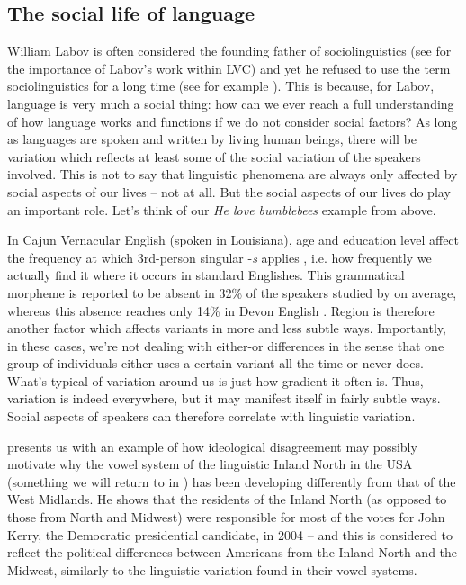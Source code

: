 \subsection{The social life of language}\label{social-life}
William Labov is often considered the founding father of sociolinguistics (see \citealp{Koerner1991} for the importance of Labov's work within LVC) and yet he refused to use the term sociolinguistics for a long time (see for example \citealp{Chambers2017}). This is because, for Labov, language is very much a social thing: how can we ever reach a full understanding of how language works and functions if we do not consider social factors? As long as languages are spoken and written by living human beings, there will be variation which reflects at least some of the social variation of the speakers involved. This is not to say that linguistic phenomena are always only affected by social aspects of our lives -- not at all. But the social aspects of our lives do play an important role. Let's think of our \textit{He love bumblebees} example from above.

In Cajun Vernacular English (spoken in Louisiana), age and education level affect the frequency at which 3rd-person singular -\emph{s} applies \citep[39]{DuboisHorvath2003}, i.e. how frequently we actually find it where it occurs in standard Englishes. This grammatical morpheme is reported to be absent in 32\% of the speakers studied by \citet[42]{DuboisHorvath2003} on average, whereas this absence reaches only 14\% in Devon English \citeyearpar[42]{DuboisHorvath2003}. Region is therefore another factor which affects variants in more and less subtle ways. Importantly, in these cases, we're not dealing with either-or differences in the sense that one group of individuals either uses a certain variant all the time or never does. What's typical of variation around us is just how gradient it often is. Thus, variation is indeed everywhere, but it may manifest itself in fairly subtle ways. Social aspects of speakers can therefore correlate with linguistic variation. 

\citet[212 and 223]{Labov2010} presents us with an example of how ideological disagreement may possibly motivate why the vowel system of the linguistic Inland North in the USA (something we will return to in ) has been developing differently from that of the West Midlands. He shows that the residents of the Inland North (as opposed to those from North and Midwest) were responsible for most of the votes for John Kerry, the Democratic presidential candidate, in 2004 -- and this is considered to reflect the political differences between Americans from the Inland North and the Midwest, similarly to the linguistic variation found in their vowel systems.


